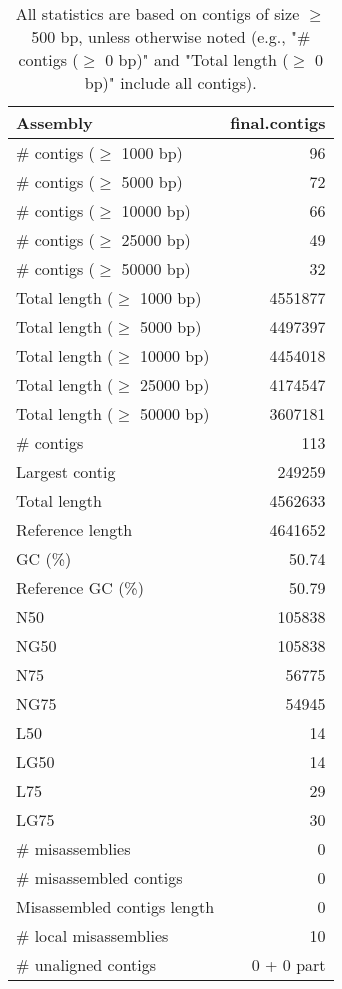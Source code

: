\documentclass[12pt,a4paper]{article}
\begin{document}
\begin{table}[ht]
\begin{center}
\caption{All statistics are based on contigs of size $\geq$ 500 bp, unless otherwise noted (e.g., "\# contigs ($\geq$ 0 bp)" and "Total length ($\geq$ 0 bp)" include all contigs).}
\begin{tabular}{|l*{1}{|r}|}
\hline
Assembly & final.contigs \\ \hline
\# contigs ($\geq$ 1000 bp) & 96 \\ \hline
\# contigs ($\geq$ 5000 bp) & 72 \\ \hline
\# contigs ($\geq$ 10000 bp) & 66 \\ \hline
\# contigs ($\geq$ 25000 bp) & 49 \\ \hline
\# contigs ($\geq$ 50000 bp) & 32 \\ \hline
Total length ($\geq$ 1000 bp) & 4551877 \\ \hline
Total length ($\geq$ 5000 bp) & 4497397 \\ \hline
Total length ($\geq$ 10000 bp) & 4454018 \\ \hline
Total length ($\geq$ 25000 bp) & 4174547 \\ \hline
Total length ($\geq$ 50000 bp) & 3607181 \\ \hline
\# contigs & 113 \\ \hline
Largest contig & 249259 \\ \hline
Total length & 4562633 \\ \hline
Reference length & 4641652 \\ \hline
GC (\%) & 50.74 \\ \hline
Reference GC (\%) & 50.79 \\ \hline
N50 & 105838 \\ \hline
NG50 & 105838 \\ \hline
N75 & 56775 \\ \hline
NG75 & 54945 \\ \hline
L50 & 14 \\ \hline
LG50 & 14 \\ \hline
L75 & 29 \\ \hline
LG75 & 30 \\ \hline
\# misassemblies & 0 \\ \hline
\# misassembled contigs & 0 \\ \hline
Misassembled contigs length & 0 \\ \hline
\# local misassemblies & 10 \\ \hline
\# unaligned contigs & 0 + 0 part \\ \hline

\end{tabular}
\end{center}
\end{table}
\end{document}
